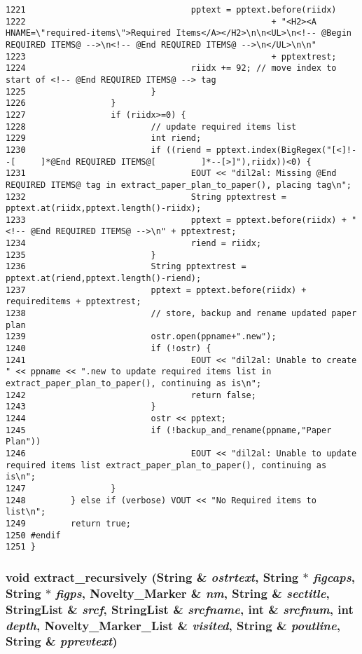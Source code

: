 \begin{verbatim}
1221                                 pptext = pptext.before(riidx)
1222                                                 + "<H2><A HNAME=\"required-items\">Required Items</A></H2>\n\n<UL>\n<!-- @Begin REQUIRED ITEMS@ -->\n<!-- @End REQUIRED ITEMS@ -->\n</UL>\n\n"
1223                                                 + pptextrest;
1224                                 riidx += 92; // move index to start of <!-- @End REQUIRED ITEMS@ --> tag
1225                         }
1226                 }
1227                 if (riidx>=0) {
1228                         // update required items list
1229                         int riend;
1230                         if ((riend = pptext.index(BigRegex("[<]!--[     ]*@End REQUIRED ITEMS@[         ]*--[>]"),riidx))<0) {
1231                                 EOUT << "dil2al: Missing @End REQUIRED ITEMS@ tag in extract_paper_plan_to_paper(), placing tag\n";
1232                                 String pptextrest = pptext.at(riidx,pptext.length()-riidx);
1233                                 pptext = pptext.before(riidx) + "<!-- @End REQUIRED ITEMS@ -->\n" + pptextrest;
1234                                 riend = riidx;
1235                         }
1236                         String pptextrest = pptext.at(riend,pptext.length()-riend);
1237                         pptext = pptext.before(riidx) + requireditems + pptextrest;
1238                         // store, backup and rename updated paper plan
1239                         ostr.open(ppname+".new");
1240                         if (!ostr) {
1241                                 EOUT << "dil2al: Unable to create " << ppname << ".new to update required items list in extract_paper_plan_to_paper(), continuing as is\n";
1242                                 return false;
1243                         }
1244                         ostr << pptext;
1245                         if (!backup_and_rename(ppname,"Paper Plan"))
1246                                 EOUT << "dil2al: Unable to update required items list extract_paper_plan_to_paper(), continuing as is\n";
1247                 }
1248         } else if (verbose) VOUT << "No Required items to list\n";
1249         return true;
1250 #endif
1251 }
\end{verbatim}\normalsize 
{}
\subsubsection{\setlength{\rightskip}{0pt plus 5cm}void extract\_\-recursively ({\bf String} \& {\em ostrtext}, {\bf String} $\ast$ {\em figcaps}, {\bf String} $\ast$ {\em figps}, {\bf Novelty\_\-Marker} \& {\em nm}, {\bf String} \& {\em sectitle}, {\bf String\-List} \& {\em srcf}, {\bf String\-List} \& {\em srcfname}, int \& {\em srcfnum}, int {\em depth}, {\bf Novelty\_\-Marker\_\-List} \& {\em visited}, {\bf String} \& {\em poutline}, {\bf String} \& {\em pprevtext})}\label{ppfilter_8cc_a20}




